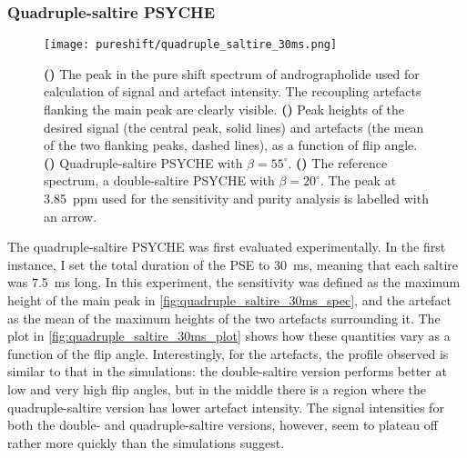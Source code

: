 \subsubsection{Quadruple-saltire PSYCHE}

\begin{figure}[htb]
    \centering
    \texttt{[image: pureshift/quadruple\_saltire\_30ms.png]}%
    {\label{fig:quadruple_saltire_30ms_spec}}%
    {\label{fig:quadruple_saltire_30ms_plot}}%
    {\label{fig:quadruple_saltire_30ms_maybebetter}}%
    {\label{fig:quadruple_saltire_30ms_reference}}%
    \caption[Comparison of 30 ms double saltire and 30 ms quadruple saltire]{
        \textbf{()} The peak in the pure shift spectrum of andrographolide used for calculation of signal and artefact intensity.
        The recoupling artefacts flanking the main peak are clearly visible.
        \textbf{()} Peak heights of the desired signal (the central peak, solid lines) and artefacts (the mean of the two flanking peaks, dashed lines), as a function of flip angle.
        \textbf{()} Quadruple-saltire PSYCHE with $\beta = 55^\circ$.
        \textbf{()} The reference spectrum, a double-saltire PSYCHE with $\beta = 20^\circ$.
        The peak at \qty{3.85}{ppm} used for the sensitivity and purity analysis is labelled with an arrow.
    }
    \label{fig:quadruple_saltire_30ms}
\end{figure}

The quadruple-saltire PSYCHE was first evaluated experimentally.
In the first instance, I set the total duration of the PSE to \qty{30}{\ms}, meaning that each saltire was \qty{7.5}{\ms} long.
In this experiment, the sensitivity was defined as the maximum height of the main peak in \cref{fig:quadruple_saltire_30ms_spec}, and the artefact as the mean of the maximum heights of the two artefacts surrounding it.
The plot in \cref{fig:quadruple_saltire_30ms_plot} shows how these quantities vary as a function of the flip angle.
Interestingly, for the artefacts, the profile observed is similar to that in the simulations: the double-saltire version performs better at low and very high flip angles, but in the middle there is a region where the quadruple-saltire version has lower artefact intensity.
The signal intensities for both the double- and quadruple-saltire versions, however, seem to plateau off rather more quickly than the simulations suggest.

